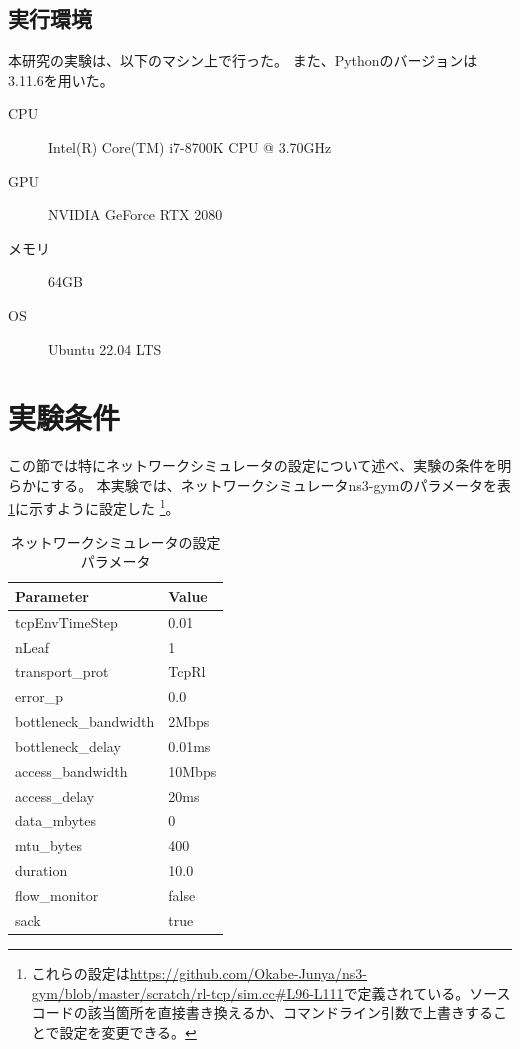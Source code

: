 \documentclass[a4paper,11pt]{jreport}
\newcommand{\tabref}[1]{表\ref{#1}}
\begin{document}
\subsection{実行環境}

本研究の実験は、以下のマシン上で行った。
また、Pythonのバージョンは3.11.6を用いた。

\begin{description}
  \item[CPU] Intel(R) Core(TM) i7-8700K CPU @ 3.70GHz
  \item[GPU] NVIDIA GeForce RTX 2080
  \item[メモリ] 64GB
  \item[OS] Ubuntu 22.04 LTS
\end{description}

\section{実験条件}

この節では特にネットワークシミュレータの設定について述べ、実験の条件を明らかにする。
本実験では、ネットワークシミュレータns3-gymのパラメータを\tabref{tab:network_simulator_parameters}に示すように設定した
\footnote{これらの設定は\url{https://github.com/Okabe-Junya/ns3-gym/blob/master/scratch/rl-tcp/sim.cc#L96-L111}で定義されている。ソースコードの該当箇所を直接書き換えるか、コマンドライン引数で上書きすることで設定を変更できる。}。
\begin{table}[ht]
  \centering
  \begin{tabular}{|l|l|}
  \hline
  \textbf{Parameter} & \textbf{Value} \\ \hline
  tcpEnvTimeStep & 0.01 \\ \hline
  nLeaf & 1 \\ \hline
  transport\_prot & TcpRl \\ \hline
  error\_p & 0.0 \\ \hline
  bottleneck\_bandwidth & 2Mbps \\ \hline
  bottleneck\_delay & 0.01ms \\ \hline
  access\_bandwidth & 10Mbps \\ \hline
  access\_delay & 20ms \\ \hline
  data\_mbytes & 0 \\ \hline
  mtu\_bytes & 400 \\ \hline
  duration & 10.0 \\ \hline
  flow\_monitor & false \\ \hline
  sack & true \\ \hline
  \end{tabular}
  \caption{ネットワークシミュレータの設定パラメータ}
  \label{tab:network_simulator_parameters}
\end{table}
\end{document}
